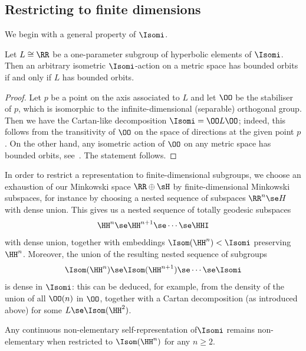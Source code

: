 \subsection{Restricting to finite dimensions}

We begin with a general property of $\Isomi$.

\begin{prop}\label{prop:BO}
Let $L\cong \RR$ be a one-parameter subgroup of hyperbolic elements of $\Isomi$. Then an arbitrary isometric $\Isomi$-action on a metric space has bounded orbits if and only if $L$ has bounded orbits.
\end{prop}

\begin{proof}
Let $p$ be a point on the axis associated to $L$ and let $\OO$ be the stabiliser of $p$, which is isomorphic to the infinite-dimensional (separable) orthogonal group. Then we have the Cartan-like decomposition $\Isomi= \OO L \OO$; indeed, this follows from the transitivity of $\OO$ on the space of directions at the given point $p$. On the other hand, any isometric action of $\OO$ on any metric space has bounded orbits, see~\cite[p.~190]{Ricard-Rosendal}. The statement follows.
\end{proof}

In order to restrict a representation to finite-dimensional subgroups, we choose an exhaustion of our Minkowski space $\RR\oplus \sH$ by finite-dimensional Minkowski subspaces, for instance by choosing a nested sequence of subspaces $\RR^n\se H$ with dense union. This gives us a nested sequence of totally geodesic subspaces
\[
\HH^n \se \HH^{n+1} \se \cdots \se \HHI
\]
with dense union, together with embeddings $\Isom(\HH^n) < \Isomi$ preserving $\HH^n$. Moreover, the union of the resulting nested sequence of subgroups
\[
\Isom(\HH^n) \se \Isom(\HH^{n+1}) \se \cdots \se \Isomi
\]
is dense in $\Isomi$: this can be deduced, for example, from the density of the union of all $\OO(n)$ in $\OO$, together with a Cartan decomposition (as introduced above) for some $L\se \Isom(\HH^2)$.

\begin{prop}\label{prop:restriction}
Any continuous non-elementary self-representation of\linebreak $\Isomi$ remains non-elementary when restricted to $\Isom(\HH^n)$ for any $n\geq 2$.
\end{prop}

